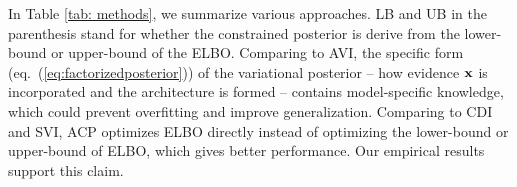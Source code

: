 In Table \ref{tab: methods}, we summarize various approaches. 
LB and UB in the parenthesis stand for whether the constrained posterior is derive from the lower-bound or upper-bound of the ELBO.
Comparing to AVI, the specific form (eq.~(\ref{eq:factorizedposterior})) of the variational posterior -- how evidence $\mathbf{x}$ is incorporated and the architecture is formed -- contains model-specific knowledge, which could prevent overfitting and improve generalization. Comparing to CDI and SVI, ACP optimizes ELBO directly instead of optimizing the lower-bound or upper-bound of ELBO, which gives better performance.
Our empirical results support this claim.  









